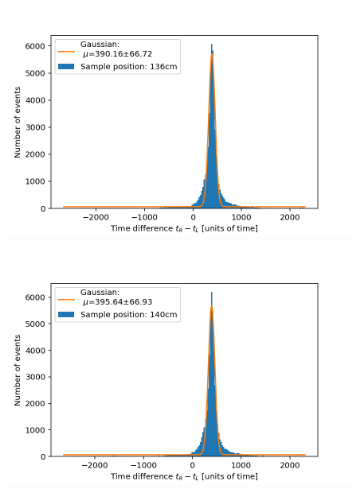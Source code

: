 \documentclass[]{article}
\begin{document}
\begin{figure}[H]
\medskip
\begin{subfigure}{0.48\textwidth}
\includegraphics[width=\linewidth]{Plots/Pos/136cm.png}
\end{subfigure}
\begin{subfigure}[c]{0.48\linewidth}
\includegraphics[width=\linewidth]{Plots/Pos/140cm.png}
\end{subfigure}


\end{figure}
\end{document}
